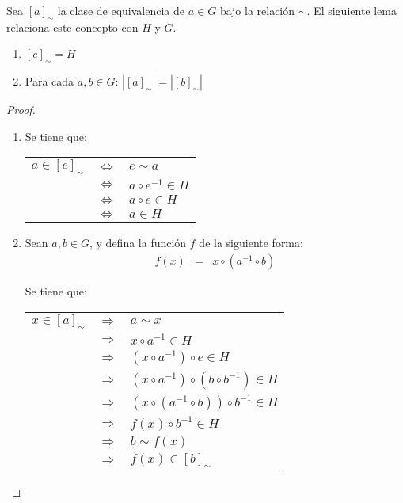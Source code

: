 
Sea $[a]_\sim$ la clase de equivalencia de $a \in G$ bajo la relación $\sim$. El siguiente lema relaciona este concepto con $H$ y $G$.
\begin{lemma}\label{lema grupo 6}
\hfill
\begin{enumerate}
\item $[e]_\sim = H$

\item Para cada $a, b \in G$: $|[a]_\sim| = |[b]_\sim|$
\end{enumerate}
\end{lemma}



\begin{proof}
\text{}
\begin{enumerate}
\item Se tiene que:

\begin{center}
\begin{tabular}{lcl}
$a \in [e]_\sim$ & $\Leftrightarrow$ & $e \sim a$\\
& $\Leftrightarrow$ & $a \circ e^{-1} \in H$\\
& $\Leftrightarrow$ & $a \circ e \in H$\\
& $\Leftrightarrow$ & $a \in H$
\end{tabular}
\end{center}

\item Sean $a,b \in G$, y defina la función $f$ de la siguiente forma:
\begin{eqnarray*}
f(x) & = & x \circ (a^{-1} \circ b)
\end{eqnarray*}

Se tiene que:

\begin{center}
\begin{tabular}{lcl}
$x \in [a]_\sim$ & $\Rightarrow$ & $a \sim x$\\
& $\Rightarrow$ & $x \circ a^{-1} \in H$\\
& $\Rightarrow$ & $(x \circ a^{-1}) \circ e \in H$\\
& $\Rightarrow$ & $(x \circ a^{-1}) \circ (b \circ b^{-1}) \in H$\\
& $\Rightarrow$ & $(x \circ (a^{-1} \circ b)) \circ b^{-1} \in H$\\
& $\Rightarrow$ & $f(x) \circ b^{-1} \in H$\\
& $\Rightarrow$ & $b \sim f(x)$\\
& $\Rightarrow$ & $f(x) \in [b]_\sim$
\end{tabular}
\end{center}



\end{enumerate}
\end{proof}
